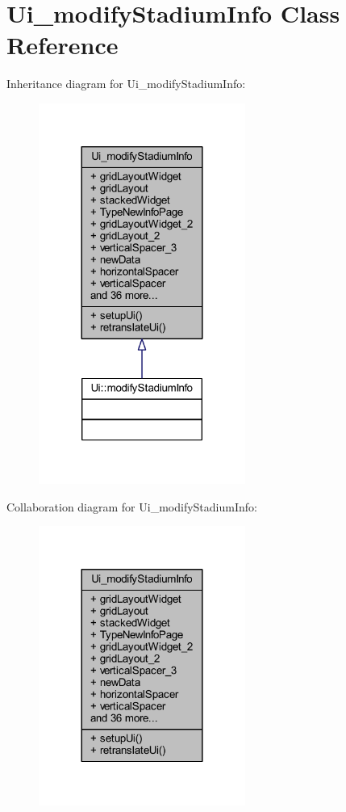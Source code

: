 \hypertarget{class_ui__modify_stadium_info}{}\section{Ui\+\_\+modify\+Stadium\+Info Class Reference}
\label{class_ui__modify_stadium_info}


Inheritance diagram for Ui\+\_\+modify\+Stadium\+Info\+:
\nopagebreak
\begin{figure}[H]
\begin{center}
\leavevmode
\includegraphics[width=192pt]{class_ui__modify_stadium_info__inherit__graph}
\end{center}
\end{figure}


Collaboration diagram for Ui\+\_\+modify\+Stadium\+Info\+:
\nopagebreak
\begin{figure}[H]
\begin{center}
\leavevmode
\includegraphics[width=192pt]{class_ui__modify_stadium_info__coll__graph}
\end{center}
\end{figure}
